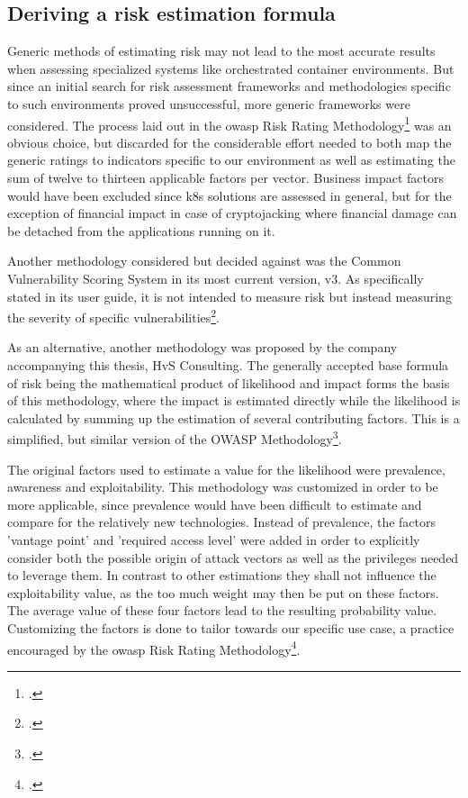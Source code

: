 \subsection{Deriving a risk estimation formula}
Generic methods of estimating risk may not lead to the most accurate results when assessing specialized systems like orchestrated container environments.
But since an initial search for risk assessment frameworks and methodologies specific to such environments proved unsuccessful, more generic frameworks were considered. 
The process laid out in the \gls{owasp} Risk Rating Methodology\footcite[][, sections 'Step 2' to 'Step 4' ]{riskRating} was an obvious choice, but discarded for the considerable effort needed to both map the generic ratings to indicators specific to our environment as well as estimating the sum of twelve to thirteen applicable factors per vector. Business impact factors would have been excluded since \gls{k8s} solutions are assessed in general, but for the exception of financial impact in case of cryptojacking where financial damage can be detached from the applications running on it.

Another methodology considered but decided against was the Common Vulnerability Scoring System in its most current version, v3. As specifically stated in its user guide, it is not intended to measure risk but instead measuring the severity of specific vulnerabilities\footcite[][, section '2.1. CVSS Measures Severity, not Risk']{cvssUserGuide}.

As an alternative, another methodology was proposed by the company accompanying this thesis, HvS Consulting. The generally accepted base formula of risk being the mathematical product of likelihood and impact forms the basis of this methodology, where the impact is estimated directly while the likelihood is calculated by summing up the estimation of several contributing factors. This is a simplified, but similar version of the OWASP Methodology\footcite[][, section 'Step 4: Determining the Severity of the Risk']{riskRating}. 

The original factors used to estimate a value for the likelihood were prevalence, awareness and exploitability. This methodology was customized in order to be more applicable, since prevalence would have been difficult to estimate and compare for the relatively new technologies. Instead of prevalence, the factors 'vantage point' and 'required access level' were added in order to explicitly consider both the possible origin of attack vectors as well as the privileges needed to leverage them. In contrast to other estimations they shall not influence the exploitability value, as the too much weight may then be put on these factors. The average value of these four factors lead to the resulting probability value. Customizing the factors is done to tailor towards our specific use case, a practice encouraged by the \gls{owasp} Risk Rating Methodology\footcite[][, section 'Step 6: Customizing the Risk Rating Model']{riskRating}.


